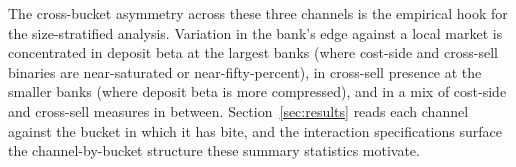 The cross-bucket asymmetry across these three channels is the empirical hook for the size-stratified analysis. Variation in the bank's edge against a local market is concentrated in deposit beta at the largest banks (where cost-side and cross-sell binaries are near-saturated or near-fifty-percent), in cross-sell presence at the smaller banks (where deposit beta is more compressed), and in a mix of cost-side and cross-sell measures in between. Section~\ref{sec:results} reads each channel against the bucket in which it has bite, and the interaction specifications surface the channel-by-bucket structure these summary statistics motivate.
